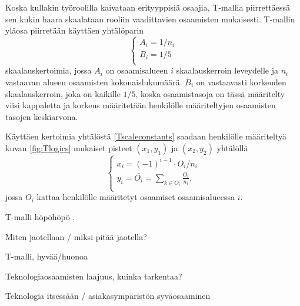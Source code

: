\documentclass[a4paper,finnish,12pt]{article}
\begin{document}
Koska kullakin työroolilla kaivataan erityyppisiä osaajia, T-mallia piirrettäessä sen kukin haara skaalataan rooliin vaadittavien osaamisten mukaisesti. T-mallin yläosa piirretään käyttäen yhtälöparin %
\begin{equation}
\begin{cases}
A_i = 1/n_i \\
B_i = 1/5 \\
\end{cases}
\label{Tscaleconstants}
\end{equation} skaalauskertoimia, jossa $A_i$ on osaamisalueen $i$ skaalauskerroin leveydelle ja $n_i$ vastaavan alueen osaamisten kokonaislukumäärä. $B_i$ on vastaavasti korkeuden skaalauskerroin, joka on kaikille $1/5$, koska osaamistasoja on tässä määritelty viisi kappaletta ja korkeus määritetään henkilölle määriteltyjen osaamisten tasojen keskiarvona.

Käyttäen kertoimia yhtälöstä \eqref{Tscaleconstants} saadaan henkilölle määriteltyä kuvan \ref{fig:Tlogics} mukaiset pisteet $(x_1, y_1)$ ja $(x_2, y_2)$ yhtälöllä
\begin{equation}
\begin{cases}
x_i = (-1)^{i-1} \cdot O_i / n_i \\
y_i = \bar{O_i} = \sum_{k \in O_i} \frac{O_i}{n_i}, \\
\end{cases}
\end{equation} jossa $O_i$ kattaa henkilölle määritetyt osaamiset osaamisalueessa $i$.


T-malli höpöhöpö \cite{T-malli}.

Miten jaotellaan / miksi pitää jaotella?

T-malli, hyvää/huonoa

Teknologiaosaamisten laajuus, kuinka tarkentaa?

Teknologia itsessään / asiakasympäristön syväosaaminen
\end{document}
